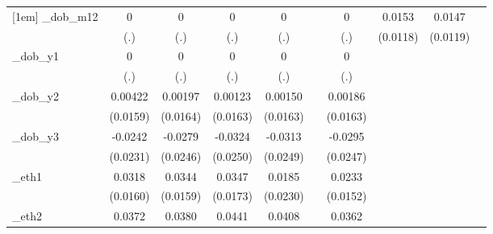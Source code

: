 \begin{table}[htbp]
\begin{tabular}{l*{9}{c}}
[1em]
\_dob\_m12    &           0         &           0         &           0         &           0         &                     &           0         &      0.0153         &      0.0147         &                     \\
            &         (.)         &         (.)         &         (.)         &         (.)         &                     &         (.)         &    (0.0118)         &    (0.0119)         &                     \\
[1em]
\_dob\_y1     &           0         &           0         &           0         &           0         &                     &           0         &                     &                     &                     \\
            &         (.)         &         (.)         &         (.)         &         (.)         &                     &         (.)         &                     &                     &                     \\
[1em]
\_dob\_y2     &     0.00422         &     0.00197         &     0.00123         &     0.00150         &                     &     0.00186         &                     &                     &                     \\
            &    (0.0159)         &    (0.0164)         &    (0.0163)         &    (0.0163)         &                     &    (0.0163)         &                     &                     &                     \\
[1em]
\_dob\_y3     &     -0.0242         &     -0.0279         &     -0.0324         &     -0.0313         &                     &     -0.0295         &                     &                     &                     \\
            &    (0.0231)         &    (0.0246)         &    (0.0250)         &    (0.0249)         &                     &    (0.0247)         &                     &                     &                     \\
[1em]
\_eth1       &      0.0318\sym{**} &      0.0344\sym{**} &      0.0347\sym{**} &      0.0185         &                     &      0.0233         &                     &                     &                     \\
            &    (0.0160)         &    (0.0159)         &    (0.0173)         &    (0.0230)         &                     &    (0.0152)         &                     &                     &                     \\
[1em]
\_eth2       &      0.0372\sym{***}&      0.0380\sym{***}&      0.0441\sym{***}&      0.0408\sym{***}&                     &      0.0362\sym{***}&                     &                     &                     \\

\end{tabular}
\end{table}

